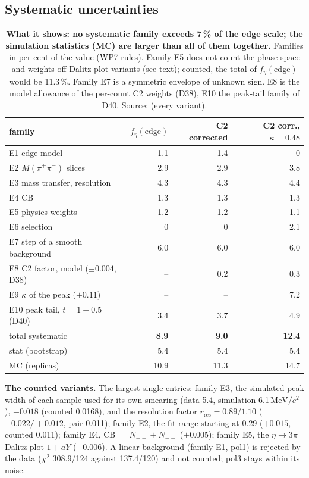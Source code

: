 \documentclass[11pt,a4paper]{article}
\newcommand{\Mpipi}{\ensuremath{M(\pi^{+}\pi^{-})}\xspace}
\newcommand{\MeVcc}{\ensuremath{\mathrm{MeV}/c^{2}}\xspace}
\newcommand{\code}[1]{\texttt{\detokenize{#1}}}
\begin{document}
\subsection{Systematic uncertainties}
\label{sec:bedge-syst}

\begin{table}[H]
\centering
\caption{\textbf{What it shows: no systematic family exceeds 7\,\% of the edge scale; the simulation statistics (MC) are larger than all of
them together.} Families in per cent of the value (WP7 rules). Family E5 does not count the phase-space and weights-off Dalitz-plot variants (see
text); counted, the total of $f_\eta(\mathrm{edge})$ would be 11.3\,\%. Family E7 is a symmetric envelope of unknown sign. E8 is the model
allowance of the per-count C2 weights (D38), E10 the peak-tail family of D40. Source: \code{tables_all/bedge_syst_v3.txt} (every variant).}
\label{tab:bedge-syst}
\footnotesize
\begin{tabular}{@{}l r r r@{}}
\toprule
family & $f_\eta(\mathrm{edge})$ & C2 corrected & C2 corr., $\kappa=0.48$ \\
\midrule
E1 edge model & 1.1 & 1.4 & 0 \\
E2 \Mpipi slices & 2.9 & 2.9 & 3.8 \\
E3 mass transfer, resolution & 4.3 & 4.3 & 4.4 \\
E4 CB & 1.3 & 1.3 & 1.3 \\
E5 physics weights & 1.2 & 1.2 & 1.1 \\
E6 selection & 0 & 0 & 2.1 \\
E7 step of a smooth background & 6.0 & 6.0 & 6.0 \\
E8 C2 factor, model ($\pm0.004$, D38) & -- & 0.2 & 0.3 \\
E9 $\kappa$ of the peak ($\pm0.11$) & -- & -- & 7.2 \\
E10 peak tail, $t=1\pm0.5$ (D40) & 3.4 & 3.7 & 4.9 \\
\midrule
total systematic & \textbf{8.9} & \textbf{9.0} & \textbf{12.4} \\
stat (bootstrap) & 5.4 & 5.4 & 5.4 \\
MC (replicas) & 10.9 & 11.3 & 14.7 \\
\bottomrule
\end{tabular}
\end{table}

\textbf{The counted variants.} The largest single entries: family E3, the simulated peak width of each sample used for its own smearing (data 5.4,
simulation 6.1\,\MeVcc), $-0.018$ (counted 0.0168), and the resolution factor $r_{\mathrm{res}}=0.89/1.10$ ($-0.022/+0.012$, pair 0.011); family E2, the
fit range starting at 0.29 ($+0.015$, counted 0.011); family E4, CB $=N_{++}+N_{--}$ ($+0.005$); family E5, the $\eta\to3\pi$ Dalitz plot $1+aY$ ($-0.006$). A linear
background (family E1, pol1) is rejected by the data ($\chi^2$ 308.9/124 against 137.4/120) and not counted; pol3 stays within its noise.
\end{document}
